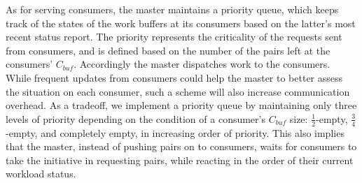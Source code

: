 \documentclass[10pt,journal,letterpaper,compsoc]{IEEEtran}
\begin{document}
As for serving consumers, the master maintains a priority queue, which keeps track of the states of the work buffers at its consumers based on the latter's most recent status report.  The priority represents the criticality of the requests sent from consumers, and is defined based on the number of the pairs left at the consumers' $C_{buf}$. Accordingly the master dispatches work to the consumers. 
While frequent updates from consumers could help the master to better assess the situation on each consumer, such a scheme will also increase communication overhead. As a tradeoff, we implement a priority queue by maintaining only three levels of priority depending on the condition of a consumer's $C_{buf}$ size: $\frac{1}{2}$-empty, $\frac{3}{4}$-empty, and completely empty, in increasing order of priority. This also implies that the master, instead of pushing pairs on to consumers, waits for consumers to take the initiative in requesting pairs, while reacting in the order of their current workload status. \\
\end{document}
